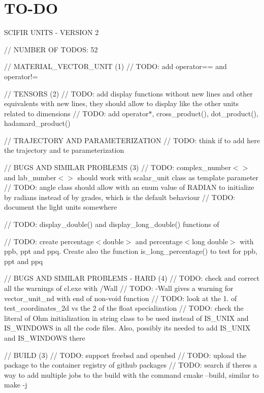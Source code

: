 \chapter{TO-\/\+DO}
\hypertarget{md_TO-DO}{}\label{md_TO-DO}
SCIFIR UNITS -\/ VERSION 2

// NUMBER OF TODOS\+: 52

// MATERIAL\+\_\+\+VECTOR\+\_\+\+UNIT (1) // TODO\+: add operator== and operator!=

// TENSORS (2) // TODO\+: add display functions without new lines and other equivalents with new lines, they should allow to display like the other units related to dimensions // TODO\+: add operator\texorpdfstring{$\ast$}{*}, cross\+\_\+product(), dot\+\_\+product(), hadamard\+\_\+product()

// TRAJECTORY AND PARAMETERIZATION // TODO\+: think if to add here the trajectory and te parameterization

// BUGS AND SIMILAR PROBLEMS (3) // TODO\+: complex\+\_\+number$<$$>$ and lab\+\_\+number$<$$>$ should work with scalar\+\_\+unit class as template parameter // TODO\+: angle class should allow with an enum value of RADIAN to initialize by radians instead of by grades, which is the default behaviour // TODO\+: document the light units somewhere

// TODO\+: display\+\_\+double() and display\+\_\+long\+\_\+double() functions of 

// TODO\+: create percentage$<$double$>$ and percentage$<$long double$>$ with ppb, ppt and ppq. Create also the function is\+\_\+long\+\_\+percentage() to test for ppb, ppt and ppq

// BUGS AND SIMILAR PROBLEMS -\/ HARD (4) // TODO\+: check and correct all the warnings of cl.\+exe with /\+Wall // TODO\+: -\/Wall gives a warning for vector\+\_\+unit\+\_\+nd with end of non-\/void function // TODO\+: look at the 1. of test\+\_\+coordinates\+\_\+2d vs the 2 of the float specialization // TODO\+: check the literal of Ohm initialization in string class to be used instead of IS\+\_\+\+UNIX and IS\+\_\+\+WINDOWS in all the code files. Also, possibly it\textquotesingle{}s needed to add IS\+\_\+\+UNIX and IS\+\_\+\+WINDOWS there

// BUILD (3) // TODO\+: support freebsd and openbsd // TODO\+: upload the package to the container registry of github packages // TODO\+: search if there\textquotesingle{}s a way to add multiple jobs to the build with the command cmake --build, similar to make -\/j

